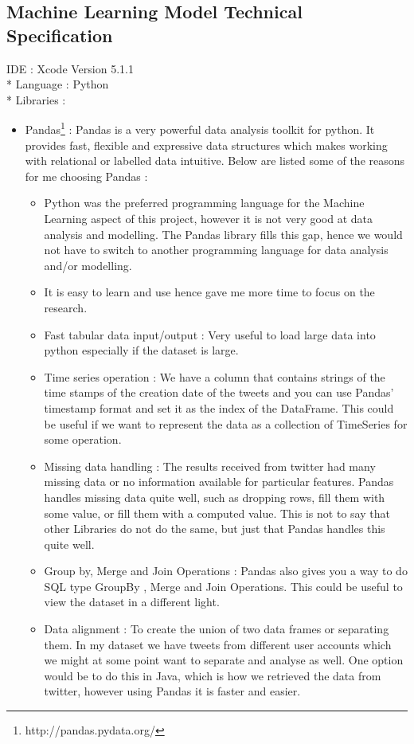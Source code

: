\subsection{Machine Learning Model Technical Specification}
IDE : Xcode Version 5.1.1 \\*
Language : Python \\*
Libraries :
\begin{itemize}
\item Pandas\footnote{http://pandas.pydata.org/} : Pandas is a very powerful data analysis toolkit for python. It provides fast, flexible and expressive data structures which makes working with relational or labelled data intuitive. Below are listed some of the reasons for me choosing Pandas :
\begin{itemize}
\item Python was the preferred programming language for the Machine Learning aspect of this project, however it is not very good at data analysis and modelling. The Pandas library fills this gap, hence we would not have to switch to another programming language for data analysis and/or modelling. 
\item It is easy to learn and use hence gave me more time to focus on the research.
\item Fast tabular data input/output : Very useful to load large data into python especially if the dataset is large.
\item Time series operation : We have a column that contains strings of the time stamps of the creation date of the tweets and you can use Pandas' timestamp format and set it as the index of the DataFrame. This could be useful if we want to represent the data as a collection of TimeSeries for some operation. 
\item Missing data handling : The results received from twitter had many missing data or no information available for particular features. Pandas handles missing data quite well, such as dropping rows, fill them with some value, or fill them with a computed value. This is not to say that other Libraries do not do the same, but just that Pandas handles this quite well. 
\item Group by, Merge and Join Operations : Pandas also gives you a way to do SQL type GroupBy , Merge and Join Operations. This could be useful to view the dataset in a different light. 
\item Data alignment : To create the union of two data frames or separating them. In my dataset we have tweets from different user accounts which we might at some point want to separate and analyse as well. One option would be to do this in Java, which is how we retrieved the data from twitter, however using Pandas it is faster and easier. 

\end{itemize}
\end{itemize}
